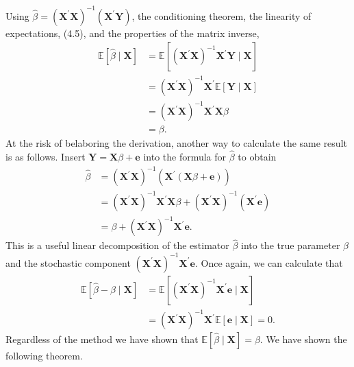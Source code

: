 \documentclass[10pt]{article}
\begin{document}
Using $\widehat{\beta}=\left(\boldsymbol{X}^{\prime} \boldsymbol{X}\right)^{-1}\left(\boldsymbol{X}^{\prime} \boldsymbol{Y}\right)$, the conditioning theorem, the linearity of expectations, (4.5), and the properties of the matrix inverse,
$$
\begin{aligned}
\mathbb{E}[\widehat{\beta} \mid \boldsymbol{X}] &=\mathbb{E}\left[\left(\boldsymbol{X}^{\prime} \boldsymbol{X}\right)^{-1} \boldsymbol{X}^{\prime} \boldsymbol{Y} \mid \boldsymbol{X}\right] \\
&=\left(\boldsymbol{X}^{\prime} \boldsymbol{X}\right)^{-1} \boldsymbol{X}^{\prime} \mathbb{E}[\boldsymbol{Y} \mid \boldsymbol{X}] \\
&=\left(\boldsymbol{X}^{\prime} \boldsymbol{X}\right)^{-1} \boldsymbol{X}^{\prime} \boldsymbol{X} \beta \\
&=\beta .
\end{aligned}
$$
At the risk of belaboring the derivation, another way to calculate the same result is as follows. Insert $\boldsymbol{Y}=\boldsymbol{X} \beta+\boldsymbol{e}$ into the formula for $\widehat{\beta}$ to obtain
$$
\begin{aligned}
\widehat{\beta} &=\left(\boldsymbol{X}^{\prime} \boldsymbol{X}\right)^{-1}\left(\boldsymbol{X}^{\prime}(\boldsymbol{X} \beta+\boldsymbol{e})\right) \\
&=\left(\boldsymbol{X}^{\prime} \boldsymbol{X}\right)^{-1} \boldsymbol{X}^{\prime} \boldsymbol{X} \beta+\left(\boldsymbol{X}^{\prime} \boldsymbol{X}\right)^{-1}\left(\boldsymbol{X}^{\prime} \boldsymbol{e}\right) \\
&=\beta+\left(\boldsymbol{X}^{\prime} \boldsymbol{X}\right)^{-1} \boldsymbol{X}^{\prime} \boldsymbol{e} .
\end{aligned}
$$
This is a useful linear decomposition of the estimator $\widehat{\beta}$ into the true parameter $\beta$ and the stochastic component $\left(\boldsymbol{X}^{\prime} \boldsymbol{X}\right)^{-1} \boldsymbol{X}^{\prime} \boldsymbol{e}$. Once again, we can calculate that
$$
\begin{aligned}
\mathbb{E}[\widehat{\beta}-\beta \mid \boldsymbol{X}] &=\mathbb{E}\left[\left(\boldsymbol{X}^{\prime} \boldsymbol{X}\right)^{-1} \boldsymbol{X}^{\prime} \boldsymbol{e} \mid \boldsymbol{X}\right] \\
&=\left(\boldsymbol{X}^{\prime} \boldsymbol{X}\right)^{-1} \boldsymbol{X}^{\prime} \mathbb{E}[\boldsymbol{e} \mid \boldsymbol{X}]=0 .
\end{aligned}
$$
Regardless of the method we have shown that $\mathbb{E}[\widehat{\beta} \mid \boldsymbol{X}]=\beta$. We have shown the following theorem.
\end{document}
